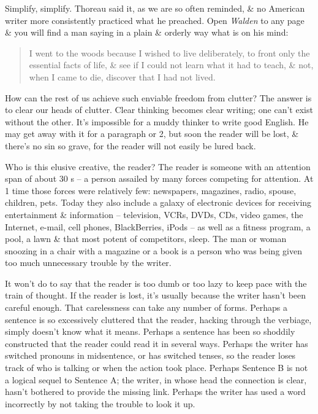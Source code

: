 \documentclass{article}
\begin{document}
Simplify, simplify. Thoreau said it, as we are so often reminded, \& no American writer more consistently practiced what he preached. Open \textit{Walden} to any page \& you will find a man saying in a plain \& orderly way what is on his mind:
\begin{quotation}
	I went to the woods because I wished to live deliberately, to front only the essential facts of life, \& see if I could not learn what it had to teach, \& not, when I came to die, discover that I had not lived.
\end{quotation}
How can the rest of us achieve such enviable freedom from clutter? The answer is to clear our heads of clutter. Clear thinking becomes clear writing; one can't exist without the other. It's impossible for a muddy thinker to write good English. He may get away with it for a paragraph or 2, but soon the reader will be lost, \& there's no sin so grave, for the reader will not easily be lured back.

Who is this elusive creative, the reader? The reader is someone with an attention span of about 30 s -- a person assailed by many forces competing for attention. At 1 time those forces were relatively few: newspapers, magazines, radio, spouse, children, pets. Today they also include a galaxy of electronic devices for receiving entertainment \& information -- television, VCRs, DVDs, CDs, video games, the Internet, e-mail, cell phones, BlackBerries, iPods -- as well as a fitness program, a pool, a lawn \& that most potent of competitors, sleep. The man or woman snoozing in a chair with a magazine or a book is a person who was being given too much unnecessary trouble by the writer. 

It won't do to say that the reader is too dumb or too lazy to keep pace with the train of thought. If the reader is lost, it's usually because the writer hasn't been careful enough. That carelessness can take any number of forms. Perhaps a sentence is so excessively cluttered that the reader, hacking through the verbiage, simply doesn't know what it means. Perhaps a sentence has been so shoddily constructed that the reader could read it in several ways. Perhaps the writer has switched pronouns in midsentence, or has switched tenses, so the reader loses track of who is talking or when the action took place. Perhaps Sentence B is not a logical sequel to Sentence A; the writer, in whose head the connection is clear, hasn't bothered to provide the missing link. Perhaps the writer has used a word incorrectly by not taking the trouble to look it up.
\end{document}
